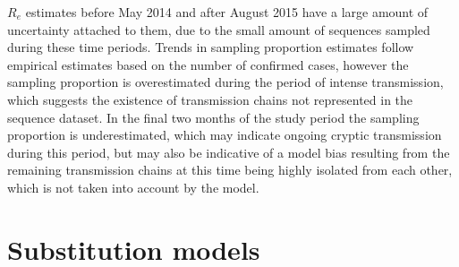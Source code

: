 {$R_e$ estimates before May 2014 and after August 2015 have a large amount of uncertainty attached to them, due to the small amount of sequences sampled during these time periods.
Trends in sampling proportion estimates follow empirical estimates based on the number of confirmed cases, however the sampling proportion is overestimated during the period of intense transmission, which suggests the existence of transmission chains not represented in the sequence dataset. 
In the final two months of the study period the sampling proportion is underestimated, which may indicate ongoing cryptic transmission during this period, but may also be indicative of a model bias resulting from the remaining transmission chains at this time being highly isolated from each other, which is not taken into account by the model. 
}









\clearpage

\section{Substitution models}


